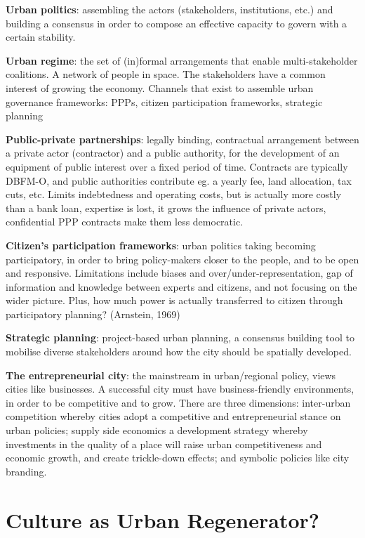 \documentclass{article}
\newcommand{\alignedmarginpar}[1]{%
        \marginpar{\raggedright\small #1}
    }
\begin{document}
\textbf{Urban politics}: assembling the actors (stakeholders, institutions, etc.) and building a consensus in order to compose an effective capacity to govern with a certain stability.

\textbf{Urban regime}: the set of (in)formal arrangements that enable multi-stakeholder coalitions. A network of people in space. The stakeholders have a common interest of growing the economy.\alignedmarginpar{Growth coalition, governance coalition} Channels that exist to assemble urban governance frameworks: PPPs, citizen participation frameworks, strategic planning

\textbf{Public-private partnerships}: legally binding, contractual arrangement between a private actor (contractor) and a public authority, for the development of an equipment of public interest over a fixed period of time. Contracts are typically DBFM-O, and public authorities contribute eg. a yearly fee, land allocation, tax cuts, etc. Limits indebtedness and operating costs, but is actually more costly than a bank loan, expertise is lost, it grows the influence of private actors, confidential PPP contracts make them less democratic. 

\textbf{Citizen's participation frameworks}: urban politics taking becoming participatory, in order to bring policy-makers closer to the people, and to be open and responsive. Limitations include biases and over/under-representation, gap of information and knowledge between experts and citizens, and not focusing on the wider picture. Plus, how much power is actually transferred to citizen through participatory planning? (Arnstein, 1969)

\textbf{Strategic planning}: project-based urban planning, a consensus building tool to mobilise diverse stakeholders around how the city should be spatially developed.

\textbf{The entrepreneurial city}: the mainstream in urban/regional policy, views cities like businesses. A successful city must have business-friendly environments, in order to be competitive and to grow. There are three dimensions: inter-urban competition whereby cities adopt a competitive and entrepreneurial stance on urban policies; supply side economics a development strategy whereby investments in the quality of a place will raise urban competitiveness and economic growth, and create trickle-down effects; and symbolic policies like city branding.

\pagebreak
\section{Culture as Urban Regenerator?}
\end{document}
